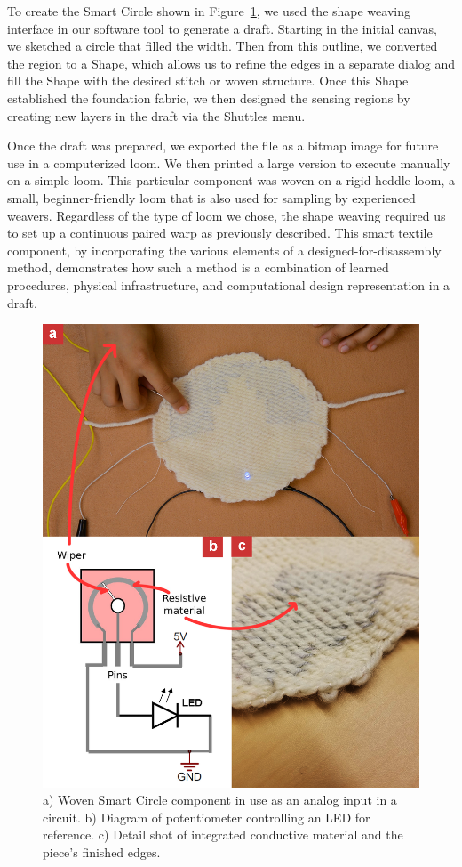 To create the Smart Circle shown in Figure~\ref{fig:smartCircle}, we used the shape weaving interface in our software tool to generate a draft. Starting in the initial canvas, we sketched a circle that filled the width. Then from this outline, we converted the region to a Shape, which allows us to refine the edges in a separate dialog and fill the Shape with the desired stitch or woven structure. Once this Shape established the foundation fabric, we then designed the sensing regions by creating new layers in the draft via the Shuttles menu. 

Once the draft was prepared, we exported the file as a bitmap image for future use in a computerized loom. We then printed a large version to execute manually on a simple loom. This particular component was woven on a rigid heddle loom, a small, beginner-friendly loom that is also used for sampling by experienced weavers. Regardless of the type of loom we chose, the shape weaving required us to set up a continuous paired warp as previously described. This smart textile component, by incorporating the various elements of a designed-for-disassembly method, demonstrates how such a method is a combination of learned procedures, physical infrastructure, and computational design representation in a draft. 

\begin{figure}
    \centering
    \includegraphics[width=0.9\linewidth]{figs/UF_sensor.png}
    \caption[Prototype of a smart textile potentiometer component.]{a) Woven Smart Circle component in use as an analog input in a circuit. b) Diagram of potentiometer controlling an LED for reference. c) Detail shot of integrated conductive material and the piece's finished edges.}
    \label{fig:smartCircle}
\end{figure}

